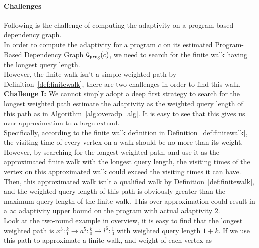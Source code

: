 \paragraph*{Challenges}
Following is the challenge of computing the adaptivity on a program based dependency graph.
\\
In order to 
compute the adaptivity for a program $c$ on its estimated Program-Based Dependency Graph $\mathtt{{G_{prog}}}(c)$, we need to 
search for the finite walk having the longest query length.
\\
However, the finite walk isn't a simple weighted path by Definition~\ref{def:finitewalk}, there are two challenges in order to find this walk.
\\
\textbf{Challenge I:}
We cannot 
simply adopt a deep first strategy to 
search for the longest weighted path
estimate the adaptivity as the weighted query length of this path
as in Algorithm~\ref{alg:overadp_alg}.
It is easy to see that this gives us over-approximation to a large extend.
\\
Specifically, according to the finite walk definition in Definition~\ref{def:finitewalk},
the visiting time of every vertex on a walk should be no more than its weight.
However, by searching for the longest weighted path, 
and use it as the approximated finite walk with the longest query length, 
the visiting times of the vertex on 
this approximated walk could 
exceed 
the visiting times it can have.
Then, this approximated walk isn't a qualified walk by Definition~\ref{def:finitewalk}, 
and the weighted query length of this path is obviously greater than the maximum query length of the finite walk.
This over-approximation could result in a $\infty$ adaptivity upper bound on the program with actual adaptivity $2$.
\\
Look at the two-round example in overview, 
it is easy to find that the longest weighted path is  $x^3 : {}^{k}_{1} \to a^5 : {}^{k}_{0} \to l^6 : {}^{1}_{0}$ with weighted query length $1 + k$.
If we use this path to approximate a finite walk, and weight of each vertex as
